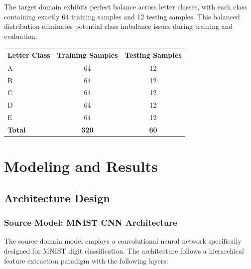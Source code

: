 \documentclass[12pt,a4paper]{article}
\begin{document}
The target domain exhibits perfect balance across letter classes, with each class containing exactly 64 training samples and 12 testing samples. This balanced distribution eliminates potential class imbalance issues during training and evaluation.

\begin{center}
\begin{tabular}{|l|c|c|}
\hline
\textbf{Letter Class} & \textbf{Training Samples} & \textbf{Testing Samples} \\
\hline
A & 64 & 12 \\
B & 64 & 12 \\
C & 64 & 12 \\
D & 64 & 12 \\
E & 64 & 12 \\
\hline
\textbf{Total} & \textbf{320} & \textbf{60} \\
\hline
\end{tabular}
\end{center}

\section{Modeling and Results}

\subsection{Architecture Design}

\subsubsection{Source Model: MNIST CNN Architecture}

The source domain model employs a convolutional neural network specifically designed for MNIST digit classification. The architecture follows a hierarchical feature extraction paradigm with the following layers:
\end{document}
